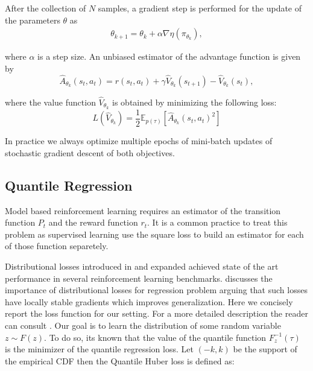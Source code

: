 \documentclass{article}
\begin{document}
    After the collection of $N$ samples, a gradient step is performed for the update of the parameters $\theta$ as
    \begin{gather}
    \theta_{k+1} = \theta_{k} + \alpha \nabla \eta(\pi_{\theta_k}),\label{eqn: thetaupdatesgrad}
    \end{gather}
    
	\noindent
    where $\alpha$ is a step size. An unbiased estimator of the advantage function is given by 
    \begin{equation}
    \hat{A}_{\theta_k}(s_t,a_t) =  r(s_t,a_t) + \gamma \hat{V}_{\theta_k} (s_{t+1}) - \hat{V}_{\theta_k}(s_t), \label{eqn: advantage}
    \end{equation}
    
	\noindent
    where the value function $\hat{V}_{\theta_k}$ is obtained by minimizing the following loss:
    \begin{equation}
        L(\hat{V}_{\theta_k}) = \frac{1}{2} \mathbb{E}_{p(\tau)} [ \hat{A}_{\theta_k}(s_t, a_t)^2]
    \end{equation}{}

    In practice we always optimize multiple epochs of mini-batch updates of stochastic gradient descent of both objectives.
\subsection{Quantile Regression}


	Model based reinforcement learning requires an estimator of the transition function $P_t$ and the reward function $r_t$. It is a common practice to treat this problem as supervised learning use the square loss to build an estimator for each of those function separetely.

	Distributional losses introduced in \cite{bellemare2017distributional} and expanded \cite{dabney2018distributional} achieved state of the art performance in several reinforcement learning benchmarks. \cite{imani2018improving} discusses the importance of distributional losses for regression problem arguing that such losses have locally stable gradients which improves generalization. Here we concisely report the loss function for our setting. For a more detailed description the reader can consult \cite{dabney2018distributional}. 
	Our goal is to learn the distribution of some random variable $z \sim F(z)$. To do so, its known that the value of the quantile function $F^{-1}_z(\tau)$ is the minimizer of the quantile regression loss. Let $(-k, k)$ be the support of the empirical CDF then the Quantile Huber loss is defined as:
\end{document}
